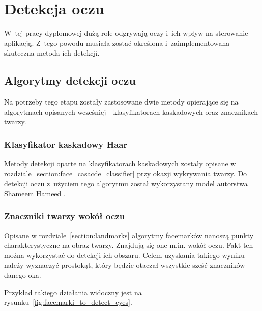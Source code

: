\newpage

\section{Detekcja oczu} \label{section:eye_detection}

W~tej pracy dyplomowej dużą role odgrywają oczy i~ich wpływ na sterowanie aplikacją. Z~tego powodu musiała zostać określona i~zaimplementowana skuteczna metoda ich detekcji.


\subsection{Algorytmy detekcji oczu}

Na potrzeby tego etapu zostały zastosowane dwie metody opierające się na algorytmach opisanych wcześniej - klasyfikatorach kaskadowych oraz znacznikach twarzy.


\subsubsection{Klasyfikator kaskadowy Haar}

Metody detekcji oparte na klasyfikatorach kaskadowych zostały opisane w rozdziale~\hyperref[{section:face_casacde_classifier}]{\ref{section:face_casacde_classifier}} przy okazji wykrywania twarzy. Do detekcji oczu z~użyciem tego algorytmu został wykorzystany model autorstwa Shameem Hameed \cite{eye_haar_model}.

\subsubsection{Znaczniki twarzy wokół oczu}

Opisane w rozdziale~\hyperref[section:landmarks]{\ref{section:landmarks}} algorytmy facemarków nanoszą punkty charakterystyczne na obraz twarzy. Znajdują się one m.in. wokół oczu. Fakt ten można wykorzystać do detekcji ich obszaru. Celem uzyskania takiego wyniku należy wyznaczyć prostokąt, który będzie otaczał wszystkie sześć znaczników danego oka. \cite{detect_eye_facemarks}

\par

Przykład takiego działania widoczny jest na rysunku~\ref{fig:facemarki_to_detect_eyes}.

